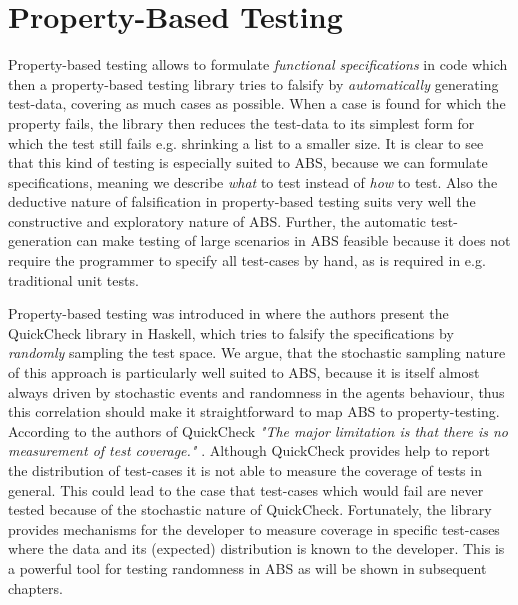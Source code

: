 \section*{Property-Based Testing}
\label{sec:proptesting}

Property-based testing allows to formulate \textit{functional specifications} in code which then a property-based testing library tries to falsify by \textit{automatically} generating test-data, covering as much cases as possible. When a case is found for which the property fails, the library then reduces the test-data to its simplest form for which the test still fails e.g. shrinking a list to a smaller size. It is clear to see that this kind of testing is especially suited to ABS, because we can formulate specifications, meaning we describe \textit{what} to test instead of \textit{how} to test. Also the deductive nature of falsification in property-based testing suits very well the constructive and exploratory nature of ABS. Further, the automatic test-generation can make testing of large scenarios in ABS feasible because it does not require the programmer to specify all test-cases by hand, as is required in e.g. traditional unit tests.

Property-based testing was introduced in \cite{claessen_quickcheck_2000,claessen_testing_2002} where the authors present the QuickCheck library in Haskell, which tries to falsify the specifications by \textit{randomly} sampling the test space. We argue, that the stochastic sampling nature of this approach is particularly well suited to ABS, because it is itself almost always driven by stochastic events and randomness in the agents behaviour, thus this correlation should make it straightforward to map ABS to property-testing.
According to the authors of QuickCheck \textit{"The major limitation is that there is no measurement of test coverage."} \cite{claessen_quickcheck_2000}. Although QuickCheck provides help to report the distribution of test-cases it is not able to measure the coverage of tests in general. This could lead to the case that test-cases which would fail are never tested because of the stochastic nature of QuickCheck. Fortunately, the library provides mechanisms for the developer to measure coverage in specific test-cases where the data and its (expected) distribution is known to the developer. This is a powerful tool for testing randomness in ABS as will be shown in subsequent chapters.

